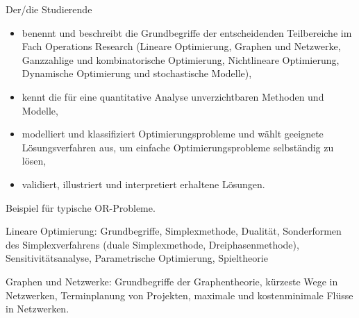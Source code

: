 \begin{module}
\begin{learningoutcomes}
Der/die Studierende

 \begin{itemize}\item benennt und beschreibt die Grundbegriffe der entscheidenden Teilbereiche im Fach Operations Research (Lineare Optimierung, Graphen und Netzwerke, Ganzzahlige und kombinatorische Optimierung, Nichtlineare Optimierung, Dynamische Optimierung und stochastische Modelle),  \item kennt die für eine quantitative Analyse unverzichtbaren Methoden und Modelle,  \item modelliert und klassifiziert Optimierungsprobleme und wählt geeignete Lösungsverfahren aus, um einfache Optimierungsprobleme selbständig zu lösen,  \item validiert, illustriert und interpretiert erhaltene Lösungen.  \end{itemize}
\end{learningoutcomes}

\begin{content}
Beispiel für typische OR-Probleme.

 

Lineare Optimierung: Grundbegriffe, Simplexmethode, Dualität, Sonderformen des Simplexverfahrens (duale Simplexmethode, Dreiphasenmethode), Sensitivitätsanalyse, Parametrische Optimierung, Spieltheorie

 

Graphen und Netzwerke: Grundbegriffe der Graphentheorie, kürzeste Wege in Netzwerken, Terminplanung von Projekten, maximale und kostenminimale Flüsse in Netzwerken.


\end{content}



\end{module}


